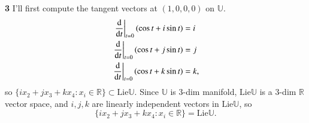 \documentclass[a4paper, 12pt]{article}
\theoremstyle{Mydefinition}
\theoremstyle{Mytheorem}
\begin{document}
\noindent \textbf{3}
I'll first compute the tangent vectors at $(1,0,0,0)$ on $\mathbb{U}$.
\begin{equation*}
\begin{split}
    \left.\dv{t}\right|_{t=0}(\cos t + i\sin t) &= i\\
    \left.\dv{t}\right|_{t=0}(\cos t + j\sin t) &= j\\
    \left.\dv{t}\right|_{t=0}(\cos t + k\sin t) &= k,
\end{split}
\end{equation*}
so $\{ix_2+jx_3+kx_4:x_i\in\mathbb{R}\}\subset \mathrm{Lie}\mathbb{U}$. Since $\mathbb{U}$ is $3$-dim manifold, $\mathrm{Lie}\mathbb{U}$ is a $3$-dim $\mathbb{R}$ vector space, and $i,j,k$ are linearly independent vectors in $\mathrm{Lie}\mathbb{U}$, so 
\begin{equation*}
    \{ix_2+jx_3+kx_4:x_i\in\mathbb{R}\} = \mathrm{Lie}\mathbb{U}.
\end{equation*}
\end{document}
